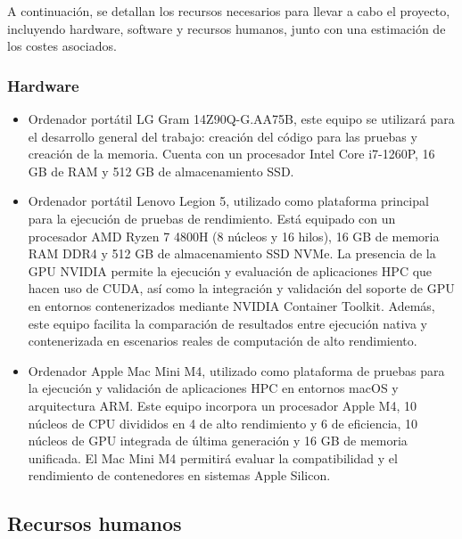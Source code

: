 A continuación, se detallan los recursos necesarios para llevar a cabo el proyecto, incluyendo hardware, software y recursos humanos, junto con una estimación de los costes asociados.

\subsubsection{Hardware}

\begin{itemize}[noitemsep]
      \item Ordenador portátil LG Gram 14Z90Q-G.AA75B, este equipo se utilizará para el desarrollo general del trabajo: creación del código para las pruebas y creación de la memoria. Cuenta con un procesador Intel Core i7-1260P, 16 GB de RAM y 512 GB de almacenamiento SSD.

      \item Ordenador portátil Lenovo Legion 5, utilizado como plataforma principal para la ejecución de pruebas de rendimiento. Está equipado con un procesador AMD Ryzen 7 4800H (8 núcleos y 16 hilos), 16 GB de memoria RAM DDR4 y 512 GB de almacenamiento SSD NVMe. La presencia de la GPU NVIDIA permite la ejecución y evaluación de aplicaciones HPC que hacen uso de CUDA, así como la integración y validación del soporte de GPU en entornos contenerizados mediante NVIDIA Container Toolkit. Además, este equipo facilita la comparación de resultados entre ejecución nativa y contenerizada en escenarios reales de computación de alto rendimiento.

      \item Ordenador Apple Mac Mini M4, utilizado como plataforma de pruebas para la ejecución y validación de aplicaciones HPC en entornos macOS y arquitectura ARM. Este equipo incorpora un procesador Apple M4, 10 núcleos de CPU divididos en 4 de alto rendimiento y 6 de eficiencia, 10 núcleos de GPU integrada de última generación y 16 GB de memoria unificada. El Mac Mini M4 permitirá evaluar la compatibilidad y el rendimiento de contenedores en sistemas Apple Silicon.
\end{itemize}

\subsection{Recursos humanos}


